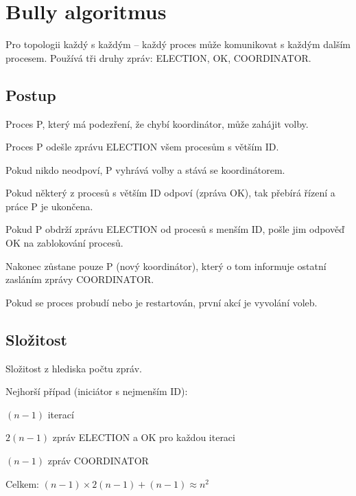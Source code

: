 
\section{Bully algoritmus}

Pro topologii každý s každým -- každý proces může komunikovat s každým dalším procesem. Používá tři druhy zpráv: ELECTION, OK, COORDINATOR.

\subsection*{Postup}

\begin{compactitem}
    \item Proces P, který má podezření, že chybí koordinátor, může zahájit volby.
    \begin{compactenum}
        \item Proces P odešle zprávu ELECTION všem procesům s větším ID.
        \item Pokud nikdo neodpoví, P vyhrává volby a stává se koordinátorem.
        \item Pokud některý z procesů s větším ID odpoví (zpráva OK), tak přebírá řízení a práce P je ukončena.
        \item Pokud P obdrží zprávu ELECTION od procesů s menším ID, pošle jim odpověď OK na zablokování procesů.
    \end{compactenum}
    \item Nakonec zůstane pouze P (nový koordinátor), který o tom informuje ostatní zasláním zprávy COORDINATOR.
    \item Pokud se proces probudí nebo je restartován, první akcí je vyvolání voleb.
\end{compactitem}

\subsection*{Složitost}

Složitost z hlediska počtu zpráv.

\bigskip\noindent Nejhorší případ (iniciátor s nejmenším ID):

\begin{compactitem}
    \item $(n-1)$ iterací
    \item $2(n-1)$ zpráv ELECTION a OK pro každou iteraci
    \item $(n-1)$ zpráv COORDINATOR
    \item Celkem: $(n-1) \times 2(n-1) + (n-1) \approx n^2$
\end{compactitem}

